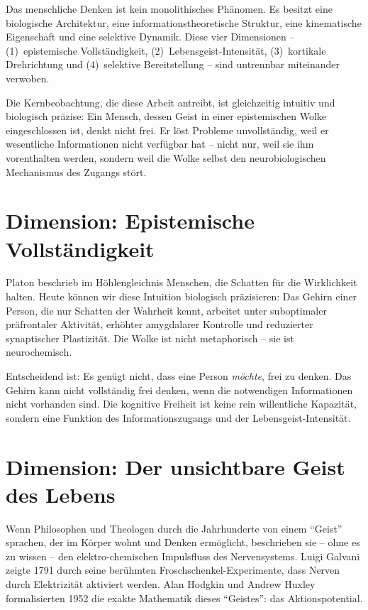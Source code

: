 ﻿\documentclass[12pt,a4paper]{report}
\theoremstyle{plain}
\theoremstyle{definition}
\theoremstyle{remark}
\begin{document}
	Das menschliche Denken ist kein monolithisches Phänomen. Es besitzt
	eine biologische Architektur, eine informationstheoretische Struktur,
	eine kinematische Eigenschaft und eine selektive Dynamik. Diese vier
	Dimensionen -- (1)~epistemische Vollständigkeit, (2)~Lebens\-geist-Intensität,
	(3)~kortikale Drehrichtung und (4)~selektive Bereitstellung -- sind
	untrennbar miteinander verwoben.
	
	Die Kernbeobachtung, die diese Arbeit antreibt, ist gleichzeitig intuitiv
	und biologisch präzise: Ein Mensch, dessen Geist in einer epistemischen
	Wolke eingeschlossen ist, denkt nicht frei. Er löst Probleme unvollständig,
	weil er wesentliche Informationen nicht verfügbar hat -- nicht nur,
	weil sie ihm vorenthalten werden, sondern weil die Wolke selbst den
	neurobiologischen Mechanismus des Zugangs stört.
	
	\section{Dimension: Epistemische Vollständigkeit}
	
	Platon beschrieb im Höhlengleichnis Menschen, die Schatten für die
	Wirklichkeit halten. Heute können wir diese Intuition biologisch präzisieren:
	Das Gehirn einer Person, die nur Schatten der Wahrheit kennt, arbeitet
	unter suboptimaler präfrontaler Aktivität, erhöhter amygdalarer
	Kontrolle und reduzierter synaptischer Plastizität. Die Wolke ist
	nicht metaphorisch -- sie ist neurochemisch.
	
	Entscheidend ist: Es genügt nicht, dass eine Person
	\emph{möchte}, frei zu denken. Das Gehirn kann nicht vollständig
	frei denken, wenn die notwendigen Informationen nicht vorhanden sind.
	Die kognitive Freiheit ist keine rein willentliche Kapazität, sondern
	eine Funktion des Informationszugangs und der Lebensgeist-Intensität.
	
	\section{Dimension: Der unsichtbare Geist des Lebens}
	
	Wenn Philosophen und Theologen durch die Jahrhunderte von einem ``Geist''
	sprachen, der im Körper wohnt und Denken ermöglicht, beschrieben
	sie -- ohne es zu wissen -- den elektro-chemischen Impulsfluss des
	Nervensystems. Luigi Galvani zeigte 1791 durch seine berühmten
	Froschschenkel-Experimente, dass Nerven durch Elektrizität aktiviert
	werden. Alan Hodgkin und Andrew Huxley formalisierten 1952 die exakte
	Mathematik dieses ``Geistes'': das Aktionspotential.
	
\end{document}
